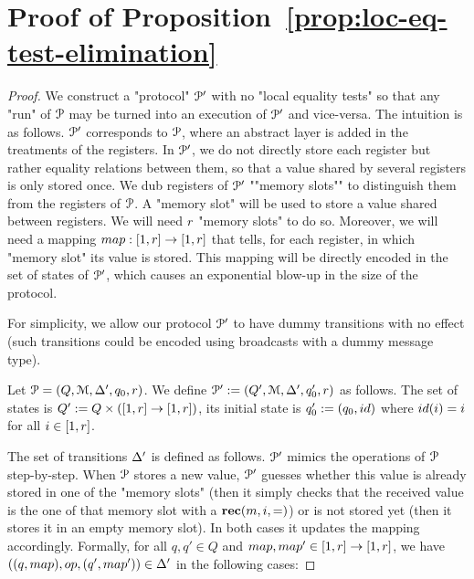 \section{Proof of Proposition~\ref{prop:loc-eq-test-elimination}}
\label{sec:proof-lol-eq-test-elim}

\SimpleReduction*

\begin{proof}
	We construct a "protocol" $\mathcal{P}'$ with no "local equality tests" so that any "run" of $\mathcal{P}$ may be turned into an execution of $\mathcal{P}'$ and vice-versa. 
	The intuition is as follows. $\mathcal{P}'$ corresponds to $\mathcal{P}$, where an abstract layer is added in the treatments of the registers. In $\mathcal{P}'$, we do not directly store each register but rather equality relations between them, so that a value shared by several registers is only stored once. We dub registers of $\mathcal{P}'$ ""memory slots"" to distinguish them from the registers of $\mathcal{P}$. A "memory slot" will be used to store a value shared between registers. 
	We will need $r$ "memory slots" to do so. Moreover, we will need a mapping $\map : \nset{1}{r} \to \nset{1}{r}$ that tells, for each register, in which "memory slot" its value is stored. This mapping will be directly encoded in the set of states of $\mathcal{P}'$, which causes an exponential blow-up in the size of the protocol.
	
	For simplicity, we allow our protocol $\mathcal{P}'$ to have dummy transitions with no effect (such transitions could be encoded using broadcasts with a dummy message type). 
	
	Let $\mathcal{P} = (Q, \mathcal{M}, \Delta', q_0, r)$. 
	We define $\mathcal{P}' := (Q', \mathcal{M}, \Delta', q_0', r)$ as follows. The set of states is $Q' := Q \times ([1,r] \to [1,r])$, its initial state is $q_0' := (q_0, \idmap)$ where $\idmap(i) = i$ for all $i \in [1,r]$. 
	
	The set of transitions $\Delta'$ is defined as follows.
	$\mathcal{P}'$ mimics the operations of $\mathcal{P}$ step-by-step. When $\mathcal{P}$ stores a new value, $\mathcal{P}'$ guesses whether this value is already stored in one of the "memory slots" (then it simply checks that the received value is the one of that memory slot with a $\textbf{rec}(m, i, {=})$) or is not stored yet (then it stores it in an empty memory slot). In both cases it updates the mapping accordingly.
	Formally, for all $q,q' \in Q$ and $\map, \map' \in \nset{1}{r} \to \nset{1}{r}$, we have $((q, \map), \op, (q', \map')) \in \transitions'$ in the following cases:
	

\end{proof}
